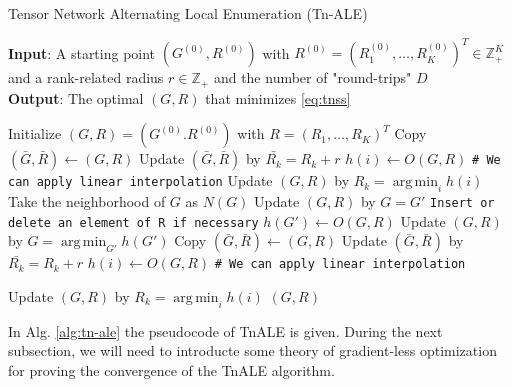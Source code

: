 \documentclass[11pt,a4paper,openright,oneside]{book}
\numberwithin{equation}{section}
\newcommand{\refeq}[1]{\cref{#1}}
\DeclareMathOperator*{\argmin}{arg\,min}
\begin{document}
{\begin{algorithm}[h]
    \caption{Tensor Network Alternating Local Enumeration (Tn-ALE)}

    \hspace*{\algorithmicindent} \textbf{Input}: A starting point $(G^{(0)}, R^{(0)})$ with $R^{(0)} = (R_1^{(0)}, \dots, R_K^{(0)})^T \in \mathbb{Z}_+^K$ 
    and a rank-related radius $r \in \mathbb{Z}_+$ and the number of "round-trips" $D$ \\ 
    \hspace*{\algorithmicindent} \textbf{Output}: The optimal $(G, R)$ that minimizes \refeq{eq:tnss}

    \begin{algorithmic}[1]
        \State Initialize $(G, R) = (G^{(0)}. R^{(0)})$ with $R = (R_1, \dots, R_K)^T$
                    \State Copy $(\bar{G}, \bar{R}) \leftarrow (G, R)$
                    \State Update $(\bar{G}, \bar{R})$ by $\bar{R_k} = R_k + r$
                    \State $h(i) \leftarrow O(G, R)$ \qquad \verb/# We can apply linear interpolation/
                \EndFor
                \State Update $(G, R)$ by $R_k = \argmin_i h(i)$
            \EndFor
            \State Take the neighborhood of $G$ as $N(G)$
                \State Update $(G, R)$ by $G = G'$ \quad \verb|Insert or delete an element of R if necessary|
                \State $h(G') \leftarrow O(G, R)$
            \EndFor
            \State Update $(G, R)$ by $G = \argmin_{G'} h(G')$
                    \State Copy $(\bar{G}, \bar{R}) \leftarrow (G, R)$
                    \State Update $(\bar{G}, \bar{R})$ by $\bar{R_k} = R_k + r$
                    \State $h(i) \leftarrow O(G, R)$ \qquad  \verb/# We can apply linear interpolation/

                \EndFor
                \State Update $(G, R)$ by $R_k = \argmin_i h(i)$
            \EndFor
        \EndFor
        \State \Return $(G, R)$

    \end{algorithmic}

    \label{alg:tn-ale}
\end{algorithm}

In Alg. \ref{alg:tn-ale} the pseudocode of \gls{TnALE} is given. During the next subsection, we will need to introducte some theory of
gradient-less optimization for proving the convergence of the \gls{TnALE} algorithm.

}
\end{document}

